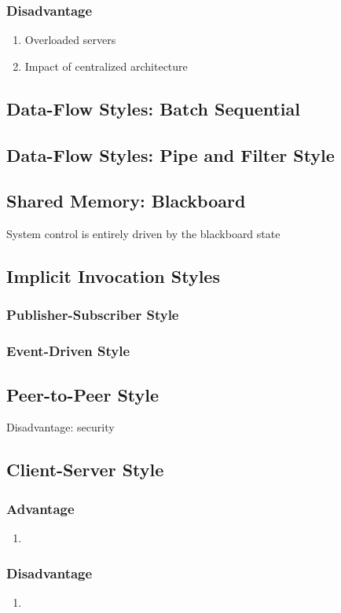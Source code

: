 \documentclass[12pt, a4paper]{article}
\begin{document}
\subsubsection*{Disadvantage}
\begin{enumerate}
  \item Overloaded servers
  \item Impact of centralized architecture
\end{enumerate}

\subsection{Data-Flow Styles: Batch Sequential}

\subsection{Data-Flow Styles: Pipe and Filter Style}

\subsection{Shared Memory: Blackboard}
System control is entirely driven by the blackboard state


\subsection{Implicit Invocation Styles}
\subsubsection*{Publisher-Subscriber Style}
\subsubsection*{Event-Driven Style}

\subsection{Peer-to-Peer Style}

Disadvantage: security


\subsection{Client-Server Style}
\subsubsection*{Advantage}
\begin{enumerate}
  \item
\end{enumerate}
\subsubsection*{Disadvantage}
\begin{enumerate}
  \item
\end{enumerate}
\end{document}
